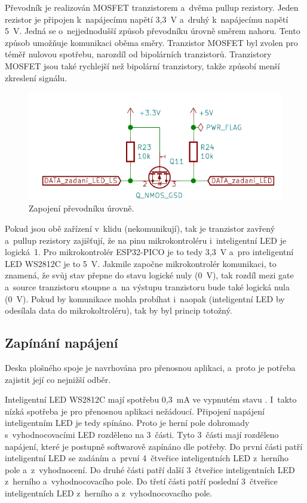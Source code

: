   Převodník je realizován MOSFET tranzistorem a~dvěma pullup rezistory. Jeden rezistor je připojen k~napájecímu napětí 3,3~V a~druhý
  k~napájecímu napětí 5~V. Jedná se o~nejjednodušší způsob převodníku úrovně směrem nahoru. Tento způsob umožňuje komunikaci oběma směry. 
  Tranzistor MOSFET byl zvolen pro téměř nulovou spotřebu, narozdíl od bipolárních tranzistorů. Tranzistory MOSFET jsou také rychlejší 
  než bipolární tranzistory, takže způsobí menší zkreslení signálu. 

  \begin{figure}[!h]
    \begin{center}
      \includegraphics[scale=0.85]{obrazky/level_shifter.png}
    \end{center}
    \caption[Zapojení převodníků úrovně]{Zapojení převodníku úrovně.}
  \end{figure}

  Pokud jsou obě zařízení v~klidu (nekomunikují), tak je tranzistor zavřený a~pullup rezistory zajišťují, že na pinu mikrokontroléru
  i~inteligentní LED je logická~1. Pro mikrokontrolér ESP32-PICO je to tedy 3,3~V a~pro inteligentní LED WS2812C je to 5~V. Jakmile započne
  mikrokontrolér komunikaci, to znamená, že svůj stav přepne do stavu logické nuly (0~V), tak rozdíl mezi gate a~source tranzistoru stoupne a~na 
  výstupu tranzistoru bude také logická nula (0~V). Pokud by komunikace mohla probíhat i~naopak (inteligentní LED by odesílala data do
  mikrokoltroléru), tak by byl princip totožný. 

  \subsection{Zapínání napájení}
  Deska plošného spoje je navrhována pro přenosnou aplikaci, a~proto je potřeba zajistit její co nejnižší odběr. 

  Inteligentní LED WS2812C mají spotřebu 0,3~mA ve vypnutém stavu \cite{WS2812C_datasheet}. I~takto nízká spotřeba je  pro přenosnou aplikaci 
  nežádoucí. Připojení
  napájení inteligentním LED je tedy spínáno. Proto je herní pole dohromady
  s~vyhodnocovacími LED rozděleno na 3~části. Tyto 3~části mají rozděleno napájení, které je postupně softwarově zapínáno dle potřeby. 
  Do první části patří inteligentní LED se zadáním a~první 4~čtveřice inteligentních LED 
  z~herního pole a~z~vyhodnocení. Do druhé části patří další 3~čtveřice inteligentních LED z~herního a~vyhodnocovacího pole. 
  Do třetí části patří poslední 3~čtveřice inteligentních LED z~herního a z~vyhodnocovacího pole.

